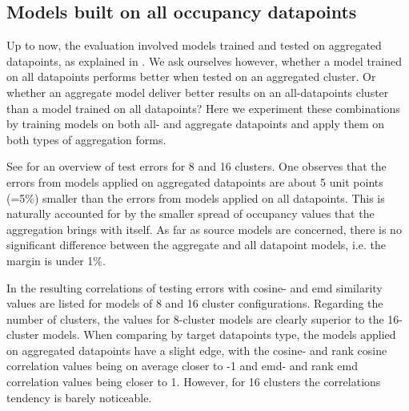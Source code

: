 

\subsection{Models built on all occupancy datapoints}
\label{evaluation:entire_datapoints}
Up to now, the evaluation involved models trained and tested on aggregated datapoints, as explained in . We ask ourselves however, whether a model trained on all datapoints performs better when tested on an aggregated cluster. Or whether an aggregate model deliver better results on an all-datapoints cluster than a model trained on all datapoints? Here we experiment these combinations by training models on both all- and aggregate datapoints and apply them on both types of aggregation forms. 

See  for an overview of test errors for 8 and 16 clusters. One observes that the errors from models applied on aggregated datapoints are about 5 unit points (=5\%) smaller than the errors from models applied on all datapoints. This is naturally accounted for by the smaller spread of occupancy values that the aggregation brings with itself. As far as source models are concerned, there is no significant difference between the aggregate and all datapoint models, i.e. the margin is under 1\%.

In  the resulting correlations of testing errors with cosine- and emd similarity values are listed for models of 8 and 16 cluster configurations. Regarding the number of clusters, the values for 8-cluster models are clearly superior to the 16-cluster models. When comparing by target datapoints type, the models applied on aggregated datapoints have a slight edge, with the cosine- and rank cosine correlation values being on average closer to -1 and emd- and rank emd correlation values being closer to 1. However, for 16 clusters the correlations tendency is barely noticeable.
	

